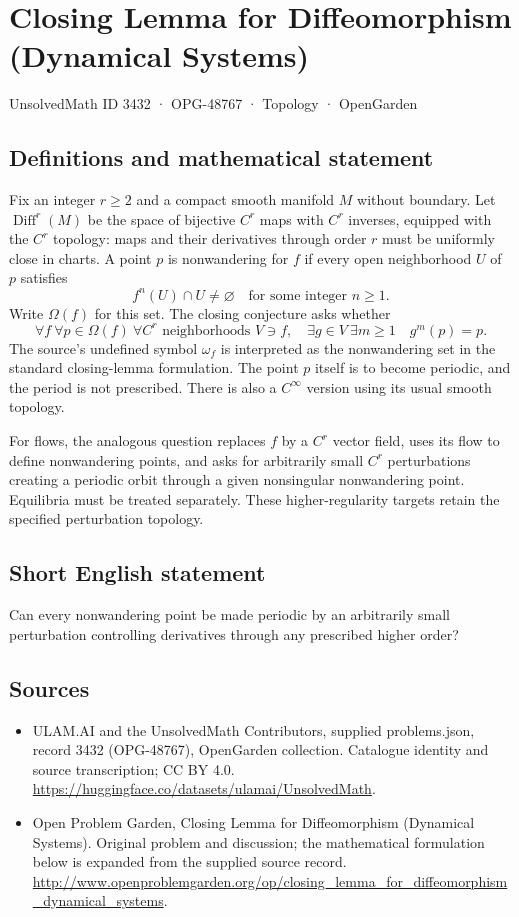 \documentclass[11pt,a4paper]{article}
\begin{document}
\section*{Closing Lemma for Diffeomorphism (Dynamical Systems)}\label{3432}
{\small UnsolvedMath ID 3432 · OPG-48767 · Topology · OpenGarden}
\subsection{Definitions and mathematical statement}
Fix an integer $r\ge2$ and a compact smooth manifold $M$ without
boundary. Let $\operatorname{Diff}^r(M)$ be the space of bijective
$C^r$ maps with $C^r$ inverses, equipped with the $C^r$ topology:
maps and their derivatives through order $r$ must be uniformly
close in charts. A point $p$ is nonwandering for $f$ if every open
neighborhood $U$ of $p$ satisfies
\[
                       f^n(U)\cap U\ne\varnothing
                       \quad\text{for some integer }n\ge1.
\]
Write $\Omega(f)$ for this set. The closing conjecture asks whether
\[
 \forall f\ \forall p\in\Omega(f)\ \forall C^r\text{ neighborhoods }V\ni f,
 \quad\exists g\in V\ \exists m\ge1\quad g^m(p)=p.
\]
The source's undefined symbol $\omega_f$ is interpreted as the
nonwandering set in the standard closing-lemma formulation. The point
$p$ itself is to become periodic, and the period is not prescribed.
There is also a $C^\infty$ version using its usual smooth topology.

For flows, the analogous question replaces $f$ by a $C^r$ vector
field, uses its flow to define nonwandering points, and asks for
arbitrarily small $C^r$ perturbations creating a periodic orbit
through a given nonsingular nonwandering point. Equilibria must be
treated separately. These higher-regularity targets retain the
specified perturbation topology.
\subsection{Short English statement}
Can every nonwandering point be made periodic by an arbitrarily small perturbation controlling derivatives through any prescribed higher order?
\subsection{Sources}
\begin{itemize}
\item[S1] ULAM.AI and the UnsolvedMath Contributors, supplied problems.json, record 3432 (OPG-48767), OpenGarden collection. Catalogue identity and source transcription; CC BY 4.0.
\url{https://huggingface.co/datasets/ulamai/UnsolvedMath}.
\item[S2] Open Problem Garden, Closing Lemma for Diffeomorphism (Dynamical Systems). Original problem and discussion; the mathematical formulation below is expanded from the supplied source record.
\url{http://www.openproblemgarden.org/op/closing_lemma_for_diffeomorphism_dynamical_systems}.
\end{itemize}
\end{document}

